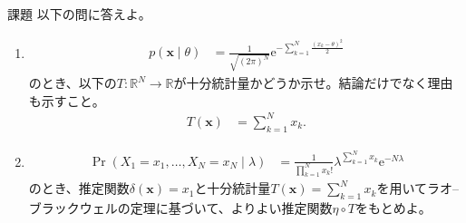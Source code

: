 \documentclass[lualatex,handout]{beamer}
\theoremstyle{definition}
\begin{document}
\begin{frame}{課題}
\small
以下の問に答えよ。
\begin{enumerate}
\setlength{\itemsep}{1em}
\item 
\begin{align*}
p(\symbf{x}\mid\theta)&= \frac1{\sqrt{(2\pi)^N}}\mathrm{e}^{-\sum_{k=1}^N\frac{(x_k-\theta)^2}2}
\end{align*}
のとき、以下の$T\colon\mathbb{R}^N\to\mathbb{R}$が十分統計量かどうか示せ。結論だけでなく理由も示すこと。
\begin{align*}
T(\symbf{x})&= \sum_{k=1}^N x_k.
\end{align*}
\item
\begin{align*}
\Pr(X_1=x_1,\dotsc,X_N=x_N\mid\lambda)&= \frac1{\prod_{k=1}^N x_k!}\lambda^{\sum_{k=1}^N x_k} \mathrm{e}^{-N\lambda}
\end{align*}
のとき、推定関数$\delta(\symbf{x})=x_1$と十分統計量$T(\symbf{x})=\sum_{k=1}^Nx_k$を用いてラオ--ブラックウェルの定理に基づいて、よりよい推定関数$\eta\circ T$をもとめよ。
\end{enumerate}
\end{frame}
\end{document}
